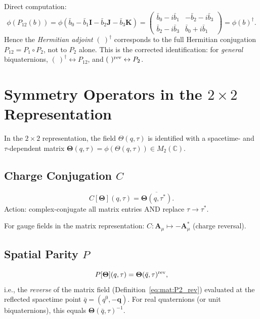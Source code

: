 \documentclass[12pt,a4paper]{article}
\theoremstyle{definition}
\theoremstyle{remark}
\begin{document}
Direct computation:
\begin{equation}
  \phi(P_{12}(b)) = \phi(\bar b_0 - \bar b_1\mathbf{I}
                     - \bar b_2\mathbf{J} - \bar b_3\mathbf{K})
  = \begin{pmatrix}
    \bar b_0 - i\bar b_1 & -\bar b_2 - i\bar b_3 \\
    \bar b_2 - i\bar b_3 & \bar b_0 + i\bar b_1
  \end{pmatrix}
  = \phi(b)^\dagger.
  \label{eq:mat:P12_matrix}
\end{equation}
Hence the \emph{Hermitian adjoint} $(\ )^\dagger$ corresponds to the full
Hermitian conjugation $P_{12} = P_1\circ P_2$, not to $P_2$ alone.
This is the corrected identification: for \emph{general} biquaternions,
$(\ )^\dagger \leftrightarrow P_{12}$, and
$(\ )^{\rm rev} \leftrightarrow P_2$.

\section{Symmetry Operators in the $2\times2$ Representation}
\label{sec:mat:sym_2x2}

In the $2\times2$ representation, the field $\Theta(q,\tau)$ is identified with
a spacetime- and $\tau$-dependent matrix
$\mathbf{\Theta}(q,\tau) = \phi(\Theta(q,\tau)) \in M_2(\mathbb{C})$.

\subsection{Charge Conjugation $C$}

\begin{equation}
  C[\mathbf{\Theta}](q,\tau) = \overline{\mathbf{\Theta}(q,\tau^*)}.
  \label{eq:mat:C_2x2}
\end{equation}
Action: complex-conjugate all matrix entries AND replace $\tau\to\tau^*$.

For gauge fields in the matrix representation:
$C: \mathbf{A}_\mu \mapsto -\mathbf{A}_\mu^*$ (charge reversal).

\subsection{Spatial Parity $P$}

\begin{equation}
  P[\mathbf{\Theta}](q,\tau) = \mathbf{\Theta}(\bar q,\tau)^{\rm rev},
  \label{eq:mat:P_2x2}
\end{equation}
i.e., the \emph{reverse} of the matrix field (Definition~\eqref{eq:mat:P2_rev})
evaluated at the reflected spacetime point $\bar q = (q^0,-\mathbf{q})$.
For real quaternions (or unit biquaternions), this equals $\mathbf{\Theta}(\bar q,\tau)^{-1}$.
\end{document}
